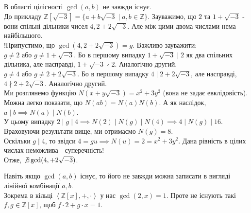 \documentclass{math_library}
\begin{document}
\begin{remark}
В області цілісності $\gcd(a,b)$ не завжди існує. \\
До прикладу $\mathbb{Z}[\sqrt{-3}] = \{a + b \sqrt{-3} \mid a,b \in \mathbb{Z}\}$. Зауважимо, що $2$ та $1+\sqrt{-3}$ - вони спільні дільники чисел $4,2+2 \sqrt{-3}$. Але між цими двома числами нема найбільшого.\\
!Припустимо, що $\gcd(4,2+2\sqrt{-3}) = g$. Важливо зауважити:\\
$g \neq 2$ або $g \neq 1+\sqrt{-3}$. Бо в першому випадку $1+\sqrt{-3} \mid 2$ як два спільних дільника, але насправді, $1+\sqrt{-3} \nmid 2$. Аналогічно другий.\\
$g \neq 4$ або $g \neq 2+2\sqrt{-3}$. Бо в першому випадку $4 \mid 2+2\sqrt{-3}$, але насправді, $4 \nmid 2+2\sqrt{-3}$. Аналогічно другий.\\
Ми розглянемо функцію $N(x+y\sqrt{-3}) = x^2+3y^2$ (вона не задає евклідовість). Можна легко показати, що $N(ab) = N(a)N(b)$. А як наслідок, $a \mid b \implies N(a) \mid N(b)$.\\
У цьому випадку $2 \mid g \mid 4 \implies N(2) \mid N(g) \mid N(4) \implies 4 \mid N(g) \mid 16$.\\
Враховуючи результати вище, ми отримаємо $N(g) = 8$.\\
Оскільки $g \mid 4$, то звідси $4 = gu \implies N(u) = 2 = x^2+3y^2$. Дана рівність в цілих числах неможлива - суперечність!\\
Отже, $\not\exists \gcd(4,  +2\sqrt{-3})$.

\end{remark}

\begin{remark}
Навіть якщо $\gcd(a,b)$ існує, то його не завжди можна записати в вигляді лінійної комбінації $a,b$.\\
Зокрема в кільці $\left<\mathbb{Z}[x],+,\cdot \right>$ у нас $\gcd(2,x) = 1$. Проте не існують такі $f,g \in \mathbb{Z}[x]$, щоб $f \cdot 2 + g \cdot x = 1$.
\end{remark}
\end{document}
